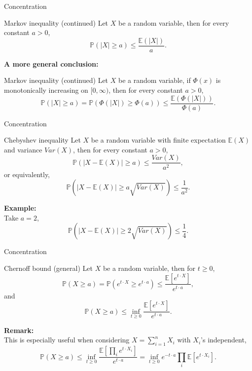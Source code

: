 \documentclass [aspectratio=169]{beamer}
\begin{document}
\begin{frame}{Concentration}
\begin{block}{Markov inequality (continued)}
    Let $X$ be a random variable, then for every constant $a>0$,
$$
\mathbb{P}(|X|\geq a)\leq {\frac {\mathbb{E} (|X|)}{a}}.
$$
    \end{block}
\vspace{0.1in}
\textbf{A more general conclusion:}\\
\begin{block}{Markov inequality (continued)}
    Let $X$ be a random variable, if $\Phi(x)$ is monotonically increasing on $[0, \infty)$, then for every constant $a>0$,
$$
\mathbb{P}(|X|\geq a) = \mathbb{P}(\Phi(|X|)\geq \Phi(a)) \leq {\frac {\mathbb{E} (\Phi(|X|))}{\Phi(a)}}.
$$
    \end{block}
\end{frame}

\begin{frame}{Concentration}
    \begin{block}{Chebyshev inequality}
    Let $X$ be a random variable with finite expectation $\mathbb{E}(X)$ and variance $Var(X)$, then for every constant $a>0$,
    $$
    \mathbb{P}(|X-\mathbb{E}(X)|\geq a) \leq {\frac {Var(X)}{a^2}},
    $$
    or equivalently,
    $$
    \mathbb{P}(|X-\mathbb{E}(X)|\geq a\sqrt{Var(X)}) \leq {\frac {1}{a^2}}.
    $$
    \end{block}
    \vspace{0.1in}
    \textbf{Example:}\\
    Take $a = 2$, $$
    \mathbb{P}(|X-\mathbb{E}(X)|\geq 2\sqrt{Var(X)}) \leq {\frac {1}{4}}.
    $$
\end{frame}


\begin{frame}{Concentration}
    \begin{block}{Chernoff bound (general)}
     Let $X$ be a random variable, then for $t \ge 0$, 
     $$
     {\mathbb{P}(X\geq a)=\mathbb{P}(e^{t\cdot X}\geq e^{t\cdot a})\leq {\frac {\mathbb{E}\left[e^{t\cdot X}\right]}{e^{t\cdot a}}},}
     $$
     and 
     $$
     \mathbb{P}(X\geq a) \le \inf_{t \ge 0}{\frac {\mathbb{E}\left[e^{t\cdot X}\right]}{e^{t\cdot a}}}.
     $$
    \end{block}
    \vspace{0.1in}
    \textbf{Remark:}\\
    This is especially useful when considering $X = \sum_{i =1}^n X_i$ with $X_i$'s independent,
    $$
    {\mathbb{P}(X\geq a)\leq \inf _{t\geq 0}{\frac {\mathbb{E} \left[\prod _{i}e^{t\cdot X_{i}}\right]}{e^{t\cdot a}}}=\inf _{t\geq 0}e^{-t\cdot a}\prod _{i}\mathbb{E} \left[e^{t\cdot X_{i}}\right].}	
    $$
\end{frame}
\end{document}
